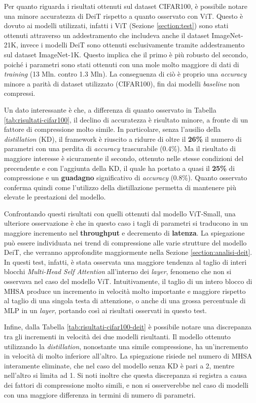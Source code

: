 Per quanto riguarda i risultati ottenuti sul dataset CIFAR100, è possibile notare una minore accuratezza di DeiT rispetto a quanto osservato con ViT. Questo è dovuto ai modelli utilizzati, infatti i ViT (Sezione \ref{section:test}) sono stati ottenuti attraverso un addestramento che includeva anche il dataset ImageNet-21K, invece i modelli DeiT sono ottenuti esclusivamente tramite addestramento sul dataset ImageNet-1K. Questo implica che il primo è più robusto del secondo, poiché i parametri sono stati ottenuti con una mole molto maggiore di dati di \textit{training} (13 Mln. contro 1.3 Mln). La conseguenza di ciò è proprio una \textit{accuracy} minore a parità di dataset utilizzato (CIFAR100), fin dai modelli \textit{baseline} non compressi. \par
Un dato interessante è che, a differenza di quanto osservato in Tabella
\ref{tab:risultati-cifar100}, il declino di accuratezza è risultato minore, a
fronte di un fattore di compressione molto simile. In particolare, senza
l'ausilio della \textit{distillation} (KD), il framework è riuscito a ridurre
di oltre il \textbf{26\%} il numero di parametri con una perdita di
\textit{accuracy} trascurabile (0.4\%). Ma il risultato di maggiore interesse è
sicuramente il secondo, ottenuto nelle stesse condizioni del precendente e con
l'aggiunta della KD, il quale ha portato a quasi il \textbf{25\%} di
compressione e un \textbf{guadagno} significativo di \textit{accuracy} (0.8\%).
Quanto osservato conferma quindi come l'utilizzo della distillazione
permetta di mantenere più elevate le prestazioni del modello. \par
Confrontando questi risultati con quelli ottenuti dal modello ViT-Small, una
ulteriore osservazione è che in questo caso i tagli di parametri si traducono
in un maggiore incremento nel \textbf{throughput} e decremento di
\textbf{latenza}. La spiegazione può essere individuata nei trend di
compressione alle varie strutture del modello DeiT, che verranno approfondite
maggiormente nella Sezione \ref{section:analisi-deit}. In questi test, infatti,
è stata osservata una maggiore tendenza al taglio di interi blocchi
\textit{Multi-Head Self Attention} all'interno dei \textit{layer}, fenomeno che
non si osservava nel caso del modello ViT. Intuitivamente, il taglio di un
intero blocco di MHSA produce un incremento in velocità molto importante e
maggiore rispetto al taglio di una singola testa di attenzione, o anche di una
grossa percentuale di MLP in un \textit{layer}, portando così ai risultati
osservati in questo test. \par
Infine, dalla Tabella \ref{tab:risultati-cifar100-deit} è possibile notare una
discrepanza tra gli incrementi in velocità dei due modelli risultanti. Il
modello ottenuto utilizzando la \textit{distillation}, nonostante una simile
compressione, ha un'incremento in velocità di molto inferiore all'altro. La
spiegazione risiede nel numero di MHSA interamente eliminate, che nel caso del
modello senza KD è pari a 2, mentre nell'altro si limita ad 1. Si noti inoltre
che questa discrepanza si registra a causa dei fattori di compressione molto
simili, e non si osserverebbe nel caso di modelli con una maggiore differenza
in termini di numero di parametri.


